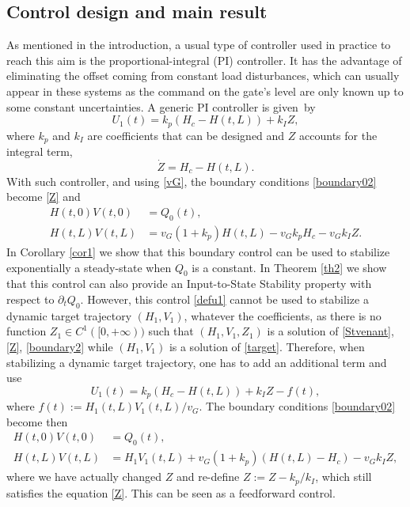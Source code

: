 \subsection{Control design and main result}
As mentioned in the introduction, a usual type of controller used in practice to reach this aim is the proportional-integral (PI) controller.
It has the advantage of eliminating the offset coming from constant load disturbances, which can usually appear in these systems
as the command on the gate's level are only known up to some constant uncertainties.
A generic PI controller is given~by
\begin{equation}
U_{1}(t)=k_{p}(H_{c}-H(t,L))+k_{I}Z,
\label{defu1}
\end{equation}
where $k_{p}$ and $k_{I}$ are coefficients that can be designed and $Z$ accounts for the integral term, \ie
\begin{equation}
\dot Z=H_{c}-H(t,L).
\label{Z}
\end{equation}
With such controller, and using \eqref{vG}, the boundary conditions \eqref{boundary02} become {\eqref{Z} and}
\begin{equation}
\label{boundary2}
\begin{split}
H(t,0)V(t,0)&=Q_{0}(t),\\
H(t,L)V(t,L)&=v_{G}(1+k_{p})H(t,L)-v_{G}k_{p}H_{c}-v_{G}k_{I}Z.
\end{split}
\end{equation}
In Corollary \ref{cor1} we show that this boundary control can be used to stabilize {exponentially} a steady-state when $Q_{0}$ is a constant.
In Theorem \ref{th2} we show that this control can also provide an Input-to-State Stability property with respect to $\partial_{t}Q_{0}$.
However, this control \eqref{defu1} cannot be used to stabilize {a} dynamic target trajectory $(H_{1},V_{1})$, {whatever the coefficients,} as there is no function $Z_{1}\in C^{1}([0,+\infty))$ such that $(H_{1},V_{1},Z_{1})$
is a solution of \eqref{Stvenant}, \eqref{Z}, \eqref{boundary2} while $(H_{1},V_{1})$ is a solution of \eqref{target}. Therefore, when stabilizing a dynamic target trajectory, one has to add an additional term and use
\begin{equation}
U_{1}(t)=k_{p}(H_{c}-H(t,L))+k_{I}Z-f(t),
\label{defu12}
\end{equation}
where $f(t):=H_{1}(t,L)V_{1}(t,L)/v_{G}$. The boundary conditions \eqref{boundary02} become then
\begin{equation}
\begin{split}
H(t,0)V(t,0)&=Q_{0}(t),\\
H(t,L)V(t,L)&=H_{1}V_{1}(t,L)+v_{G}(1+k_{p})(H(t,L)-H_{c})-v_{G}k_{I}Z,
\label{boundary1}
\end{split}
\end{equation}
where we have actually changed $Z$ and re-define $Z:=Z-k_{p}/k_{I}$, which still satisfies the equation \eqref{Z}. {This can be seen as a feedforward control.}


